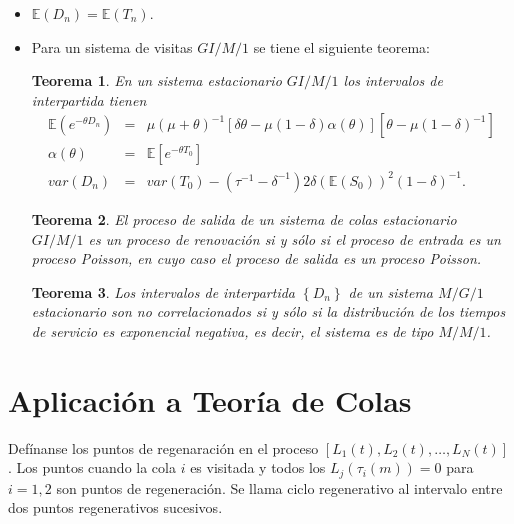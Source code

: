 \documentclass{article}
\newtheorem{Teo}{Teorema}[section]
\newcommand{\esp}{\mathbb{E}}
\numberwithin{equation}{section}
\begin{document}
{\begin{itemize}
\item $\esp\left(D_{n}\right)=\esp\left(T_{n}\right)$.

\item Para un sistema de visitas $GI/M/1$ se tiene el siguiente teorema:

\begin{Teo}
En un sistema estacionario $GI/M/1$ los intervalos de interpartida tienen
\begin{eqnarray*}
\esp\left(e^{-\theta D_{n}}\right)&=&\mu\left(\mu+\theta\right)^{-1}\left[\delta\theta
-\mu\left(1-\delta\right)\alpha\left(\theta\right)\right]
\left[\theta-\mu\left(1-\delta\right)^{-1}\right]\\
\alpha\left(\theta\right)&=&\esp\left[e^{-\theta T_{0}}\right]\\
var\left(D_{n}\right)&=&var\left(T_{0}\right)-\left(\tau^{-1}-\delta^{-1}\right)
2\delta\left(\esp\left(S_{0}\right)\right)^{2}\left(1-\delta\right)^{-1}.
\end{eqnarray*}
\end{Teo}



\begin{Teo}
El proceso de salida de un sistema de colas estacionario $GI/M/1$ es un proceso de renovaci\'on si y s\'olo si el proceso de entrada es un proceso Poisson, en cuyo caso el proceso de salida es un proceso Poisson.
\end{Teo}


\begin{Teo}
Los intervalos de interpartida $\left\{D_{n}\right\}$ de un sistema $M/G/1$ estacionario son no correlacionados si y s\'olo si la distribuci\'on de los tiempos de servicio es exponencial negativa, es decir, el sistema es de tipo  $M/M/1$.

\end{Teo}



\end{itemize}

\section{Aplicaci\'on a Teor\'ia de Colas}



Def\'inanse los puntos de regenaraci\'on  en el proceso $\left[L_{1}\left(t\right),L_{2}\left(t\right),\ldots,L_{N}\left(t\right)\right]$. Los puntos cuando la cola $i$ es visitada y todos los $L_{j}\left(\tau_{i}\left(m\right)\right)=0$ para $i=1,2$  son puntos de regeneraci\'on. Se llama ciclo regenerativo al intervalo entre dos puntos regenerativos sucesivos.

}
\end{document}
